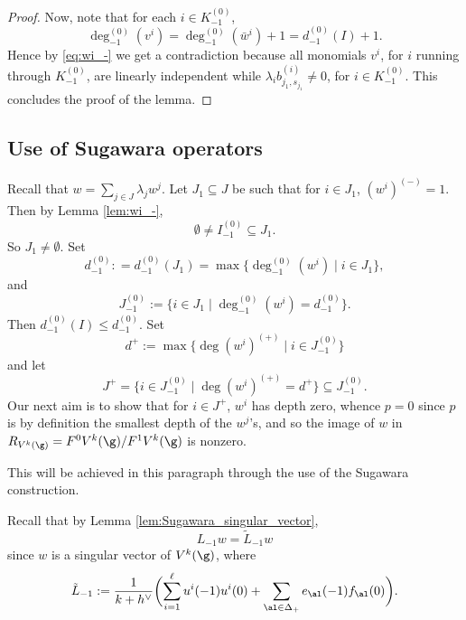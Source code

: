 \begin{proof}
Now, note that for each $i \in K_{-1}^{(0)}$,
\[
\deg_{-1}^{(0)}(v^{i})=\deg_{-1}^{(0)}(\bar w^{i})+1 = d_{-1}^{(0)}(I) +1.
\]
Hence by \eqref{eq:wi_-} we get a contradiction because all monomials
$v^{i}$, for $i$ running through $K_{-1}^{(0)}$, are linearly independent
while $\lambda_i b_{j_1,s_{j_1}}^{(i)} \not=0$, for $i\in K_{-1}^{(0)}$.
This concludes the proof of the lemma.
\end{proof}

\subsection{Use of Sugawara operators}
\label{sub:Sugawara operators}
Recall that $w = \sum_{j \in J} \lambda_j w^j$.
Let $J_1\subseteq J$ be such that for $i\in J_1$, $(w^i)^{(-)}=1$. Then by Lemma \ref{lem:wi_-},
\[
\emptyset \neq I_{-1}^{(0)}\subseteq J_1.
\]
So $J_1\neq \emptyset.$
Set
\[
{d}_{-1}^{(0)}: = {d}_{-1}^{(0)} (J_1) = \max\{\deg_{-1}^{(0)}(w^i) \mid i \in J_1\},
\]
and
\[
J_{-1}^{(0)} := \{ i\in J_1 \mid \deg_{-1}^{(0)}(w^i)= {d}_{-1}^{(0)}\}.
\]
Then $d_{-1}^{(0)}(I)\leq {d}_{-1}^{(0)}$. Set
\[
d^{+} := \max\{\deg (w^{i})^{(+)} \mid i \in J_{-1}^{(0)} \}
\]
and let
\[
J^+= \{i \in J_{-1}^{(0)} \mid \deg (w^{i})^{(+)}= d^{+} \}\subseteq J_{-1}^{(0)}.
\]
Our next aim is to show that for $i\in J^+$,
$w^{i}$ has depth zero, whence $p=0$ since $p$ is by definition
the smallest depth of the $w^j$'s, and so
the image of $w$ in
$R_{V^k(\g)} = F^0 V^k(\g)/ F^1 V^k(\g)$ is nonzero.

This will be achieved in this paragraph through the use of
the Sugawara construction.

Recall that
by Lemma \ref{lem:Sugawara_singular_vector},
\[
L_{-1} w=\tilde{L}_{-1} w
\]
since $w$ is a singular vector of $V^k(\g)$, where
\begin{equation*}
{\tilde{L}_{-1}:=\dfrac{1}{k+h^\vee} \biggl(\sum_{i=1}^{\ell}u^i(-1)u^i(0)
+\sum_{\al\in{\Delta}_{+}}e_{\al}(-1)f_{\al}(0)\biggr)}.
\end{equation*}

